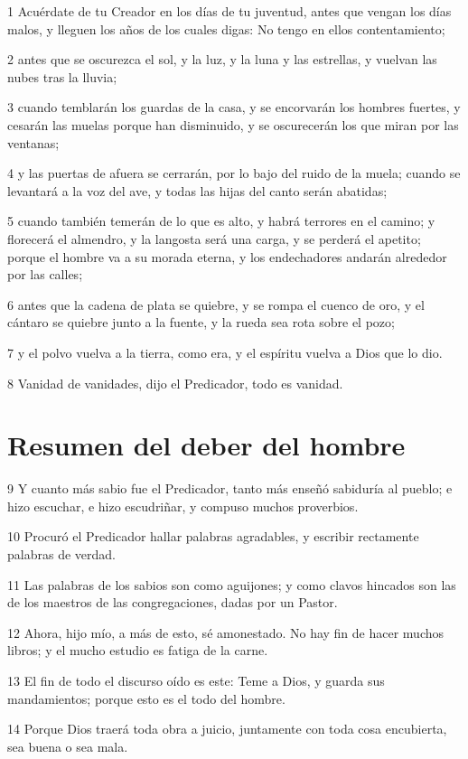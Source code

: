 \par 1 Acuérdate de tu Creador en los días de tu juventud, antes que vengan los días malos, y lleguen los años de los cuales digas: No tengo en ellos contentamiento;
\par 2 antes que se oscurezca el sol, y la luz, y la luna y las estrellas, y vuelvan las nubes tras la lluvia;
\par 3 cuando temblarán los guardas de la casa, y se encorvarán los hombres fuertes, y cesarán las muelas porque han disminuido, y se oscurecerán los que miran por las ventanas;
\par 4 y las puertas de afuera se cerrarán, por lo bajo del ruido de la muela; cuando se levantará a la voz del ave, y todas las hijas del canto serán abatidas;
\par 5 cuando también temerán de lo que es alto, y habrá terrores en el camino; y florecerá el almendro, y la langosta será una carga, y se perderá el apetito; porque el hombre va a su morada eterna, y los endechadores andarán alrededor por las calles;
\par 6 antes que la cadena de plata se quiebre, y se rompa el cuenco de oro, y el cántaro se quiebre junto a la fuente, y la rueda sea rota sobre el pozo;
\par 7 y el polvo vuelva a la tierra, como era, y el espíritu vuelva a Dios que lo dio.
\par 8 Vanidad de vanidades, dijo el Predicador, todo es vanidad.

\section*{Resumen del deber del hombre}

\par 9 Y cuanto más sabio fue el Predicador, tanto más enseñó sabiduría al pueblo; e hizo escuchar, e hizo escudriñar, y compuso muchos proverbios.
\par 10 Procuró el Predicador hallar palabras agradables, y escribir rectamente palabras de verdad.
\par 11 Las palabras de los sabios son como aguijones; y como clavos hincados son las de los maestros de las congregaciones, dadas por un Pastor.
\par 12 Ahora, hijo mío, a más de esto, sé amonestado. No hay fin de hacer muchos libros; y el mucho estudio es fatiga de la carne.
\par 13 El fin de todo el discurso oído es este: Teme a Dios, y guarda sus mandamientos; porque esto es el todo del hombre.
\par 14 Porque Dios traerá toda obra a juicio, juntamente con toda cosa encubierta, sea buena o sea mala.

